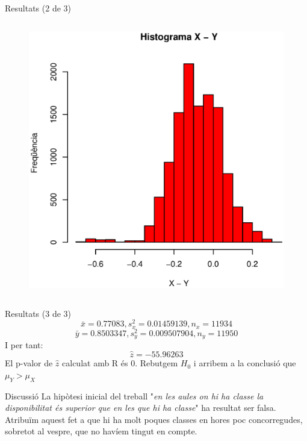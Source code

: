 \documentclass[xetex,mathserif,serif]{beamer}
\begin{document}
\begin{frame}{Resultats (2 de 3)}
\begin{columns}[T]
\begin{column}{0.4\linewidth}
\begin{figure}
      \includegraphics[width=1\linewidth]{images/histograma}
      \end{figure}
    \end{column}
    \end{columns}
  \end{frame}
  
  \begin{frame}{Resultats (3 de 3)}
    $$\bar{x} = 0.77083, s^2_x = 0.01459139, n_x = 11934$$
    $$\bar{y} = 0.8503347, s^2_y = 0.009507904, n_y = 11950$$
    I per tant:
    $$\hat{z} = -55.96263$$
    El p-valor de $\hat{z}$ calculat amb R és 0. Rebutgem $H_0$ i arribem a la conclusió que $\mu_Y > \mu_X$
  \end{frame}
  
  \begin{frame}{Discussió}
    La hipòtesi inicial del treball "\emph{en les aules on hi ha classe la disponibilitat és superior que en les que hi ha classe}" ha resultat ser falsa. \\
    Atribuïm aquest fet a que hi ha molt poques classes en hores poc concorregudes, sobretot al vespre, que no havíem tingut en compte.
  \end{frame}
\end{document}
